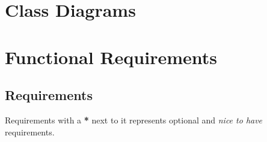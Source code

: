 \documentclass[11pt,a4paper]{article}
\begin{document}
\pagebreak

\section*{Class Diagrams}

\clearpage

\pagebreak

\section*{Functional Requirements}

\subsection*{Requirements}
Requirements with a \textbf{*} next to it represents optional and \textit{nice to have} requirements.
\end{document}
